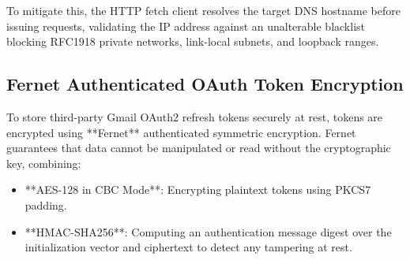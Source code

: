 To mitigate this, the HTTP fetch client resolves the target DNS hostname before issuing requests, validating the IP address against an unalterable blacklist blocking RFC1918 private networks, link-local subnets, and loopback ranges.

\subsection{Fernet Authenticated OAuth Token Encryption}
To store third-party Gmail OAuth2 refresh tokens securely at rest, tokens are encrypted using **Fernet** authenticated symmetric encryption. Fernet guarantees that data cannot be manipulated or read without the cryptographic key, combining:
\begin{itemize}
    \item **AES-128 in CBC Mode**: Encrypting plaintext tokens using PKCS7 padding.
    \item **HMAC-SHA256**: Computing an authentication message digest over the initialization vector and ciphertext to detect any tampering at rest.
\end{itemize}


